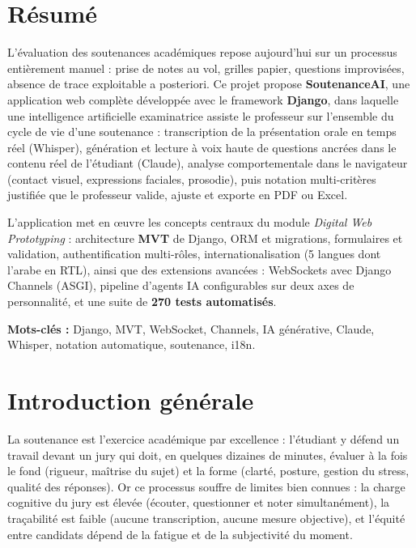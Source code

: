 \documentclass[12pt,a4paper]{report}
\begin{document}
\chapter*{Résumé}

L'évaluation des soutenances académiques repose aujourd'hui sur un processus
entièrement manuel : prise de notes au vol, grilles papier, questions improvisées,
absence de trace exploitable a posteriori. Ce projet propose
\textbf{SoutenanceAI}, une application web complète développée avec le framework
\textbf{Django}, dans laquelle une intelligence artificielle examinatrice assiste
le professeur sur l'ensemble du cycle de vie d'une soutenance : transcription de
la présentation orale en temps réel (Whisper), génération et lecture à voix haute
de questions ancrées dans le contenu réel de l'étudiant (Claude), analyse
comportementale dans le navigateur (contact visuel, expressions faciales,
prosodie), puis notation multi-critères justifiée que le professeur valide,
ajuste et exporte en PDF ou Excel.

L'application met en œuvre les concepts centraux du module \emph{Digital Web
Prototyping} : architecture \textbf{MVT} de Django, ORM et migrations,
formulaires et validation, authentification multi-rôles, internationalisation
(5 langues dont l'arabe en RTL), ainsi que des extensions avancées : WebSockets
avec Django Channels (ASGI), pipeline d'agents IA configurables sur deux axes de
personnalité, et une suite de \textbf{270 tests automatisés}.

\medskip
\noindent\textbf{Mots-clés :} Django, MVT, WebSocket, Channels, IA générative,
Claude, Whisper, notation automatique, soutenance, i18n.

\tableofcontents
\listoffigures

\chapter*{Introduction générale}

La soutenance est l'exercice académique par excellence : l'étudiant y défend un
travail devant un jury qui doit, en quelques dizaines de minutes, évaluer à la
fois le fond (rigueur, maîtrise du sujet) et la forme (clarté, posture, gestion
du stress, qualité des réponses). Or ce processus souffre de limites bien
connues : la charge cognitive du jury est élevée (écouter, questionner et noter
simultanément), la traçabilité est faible (aucune transcription, aucune mesure
objective), et l'équité entre candidats dépend de la fatigue et de la
subjectivité du moment.
\end{document}

